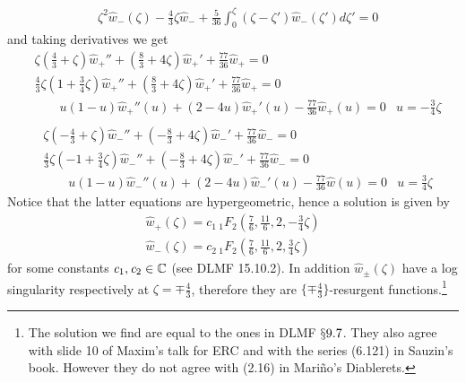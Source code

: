 \documentclass[11pt,a4paper,twoside,leqno,noamsfonts]{amsart}
\numberwithin{equation}{section}
\begin{document}
\begin{example}[Airy]
\begin{align*}
&\zeta^2\hat{w}_{-}(\zeta)-\frac{4}{3}\zeta\hat{w}_{-}+\frac{5}{36}\int_0^\zeta(\zeta-\zeta')\hat{w}_{-}(\zeta')d\zeta'=0
\end{align*}
and taking derivatives we get
\begin{align*}
&\zeta(\frac{4}{3}+ \zeta)\hat{w}_{+}''+(\frac{8}{3}+4\zeta)\hat{w}_+'+\frac{77}{36}\hat{w}_{+}=0 & \\
&\frac{4}{3}\zeta( 1+ \frac{3}{4}\zeta)\hat{w}_{+}''+(\frac{8}{3}+4\zeta)\hat{w}_+'+\frac{77}{36}\hat{w}_{+}=0 & \\
&\qquad u(1-u)\hat{w}_+''(u)+(2-4u)\hat{w}_+'(u)-\frac{77}{36}\hat{w}_+(u)=0 & u=-\frac{3}{4}\zeta\\
\end{align*} 
\begin{align*}
&\zeta(-\frac{4}{3}+ \zeta)\hat{w}_{-}''+(-\frac{8}{3}+4\zeta)\hat{w}_-'+\frac{77}{36}\hat{w}_{-}=0 & \\
&\frac{4}{3}\zeta(-1+ \frac{3}{4}\zeta)\hat{w}_{-}''+(-\frac{8}{3}+4\zeta)\hat{w}_-'+\frac{77}{36}\hat{w}_{-}=0 & \\
&\qquad u(1-u)\hat{w}_-''(u)+(2-4u)\hat{w}_-'(u)-\frac{77}{36}\hat{w}(u)=0 & u=\frac{3}{4}\zeta
\end{align*} 
Notice that the latter equations are hypergeometric, hence a solution is given by 
\begin{align}
\label{hat+}\hat{w}_+(\zeta)=\mathit{c}_1 \, {}_{1}F_{2}\left(\frac{7}{6},\frac{11}{6},2,-\frac{3}{4}\zeta\right)\\
\label{hat-}\hat{w}_-(\zeta)=\mathit{c}_2 \, {}_{1}F_{2}\left(\frac{7}{6},\frac{11}{6},2,\frac{3}{4}\zeta\right)
\end{align}
for some constants $\mathit{c}_1, \mathit{c}_2\in\mathbb C$ (see DLMF 15.10.2). In addition $\hat{w}_{\pm}(\zeta)$ have a log singularity respectively at $\zeta=\mp\frac{4}{3}$, therefore they are $\lbrace\mp\frac{4}{3}\rbrace $-resurgent functions.\footnote{The solution we find are equal to the ones in DLMF $\mathsection 9.7$. They also agree with slide 10 of Maxim's talk for ERC and with the series (6.121) in Sauzin's book. However they do not agree with (2.16) in Mari\~no's Diablerets.}


\end{example}
\end{document}
